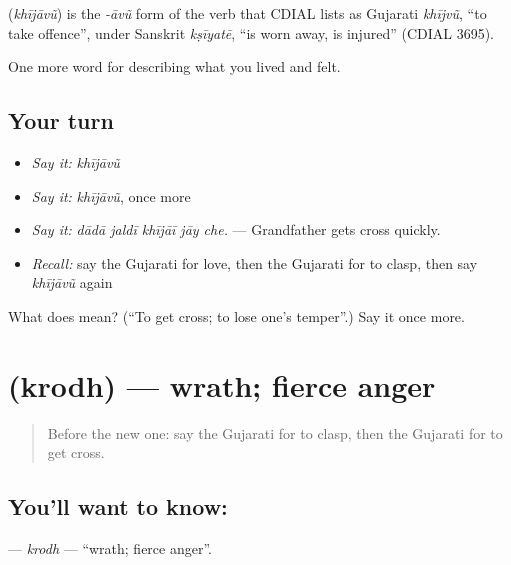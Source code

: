 \begin{cousinweb}
\textbf{} (\emph{khījāvũ}) is the \emph{-āvũ} form of the verb that CDIAL lists as Gujarati \emph{khījvũ}, \textquotedblleft{}to take offence\textquotedblright{}, under Sanskrit \emph{kṣīyatē}, \textquotedblleft{}is worn away, is injured\textquotedblright{} (CDIAL 3695).
\end{cousinweb}

\begin{grammarlens}[title={What you've built}]
One more word for describing what you lived and felt.
\end{grammarlens}

\subsection*{Your turn}
\begin{itemize}
\raggedright
  \item \emph{Say it:} \emph{khījāvũ}
  \item \emph{Say it:} \emph{khījāvũ}, once more
  \item \emph{Say it:} \emph{dādā jaldī khījāī jāy che.} — Grandfather gets cross quickly.
  \item \emph{Recall:} say the Gujarati for love, then the Gujarati for to clasp, then say \emph{khījāvũ} again
\end{itemize}

\begin{tcolorbox}[breakable,colback=teal!4,colframe=teal!35!black,title={Before you move on}]
What does  mean? (\textquotedblleft{}To get cross; to lose one's temper\textquotedblright{}.) Say it once more.
\end{tcolorbox}
\section[\texorpdfstring{\gu{ક્રોધ} (krodh)}{ક્રોધ (krodh)}]{ (krodh) — wrath; fierce anger}

\label{lesson:GU-C452-krodh}



\begin{quote}
Before the new one: say the Gujarati for to clasp, then the Gujarati for to get cross.
\end{quote}

\subsection*{You'll want to know: }
\textbf{} — \emph{krodh} — \textquotedblleft{}wrath; fierce anger\textquotedblright{}.


